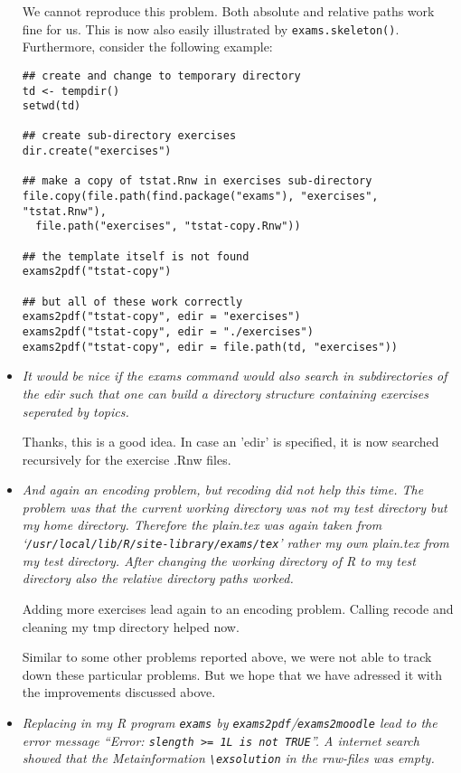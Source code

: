 \documentclass[a4paper]{article}
\begin{document}
\begin{itemize}
We cannot reproduce this problem. Both absolute and relative paths work fine
for us. This is now also easily illustrated by \texttt{exams.skeleton()}. Furthermore,
consider the following example:
\begin{verbatim}
## create and change to temporary directory
td <- tempdir()
setwd(td)

## create sub-directory exercises
dir.create("exercises")

## make a copy of tstat.Rnw in exercises sub-directory
file.copy(file.path(find.package("exams"), "exercises", "tstat.Rnw"),
  file.path("exercises", "tstat-copy.Rnw"))

## the template itself is not found
exams2pdf("tstat-copy")

## but all of these work correctly
exams2pdf("tstat-copy", edir = "exercises")
exams2pdf("tstat-copy", edir = "./exercises")
exams2pdf("tstat-copy", edir = file.path(td, "exercises"))
\end{verbatim}

\item {\it
It would be
nice if the exams command would also search in subdirectories of the edir
such that one can build a directory structure containing exercises
seperated by topics.}

Thanks, this is a good idea. In case an 'edir' is specified, it is now searched
recursively for the exercise .Rnw files.

\item {\it
And again an encoding problem, but recoding did not help this time. The
problem was that the current working directory was not my test directory
but my home directory.  Therefore the plain.tex was again taken from
`\texttt{/usr/local/lib/R/site-library/exams/tex}' rather my own plain.tex from my
test directory.  After changing the working directory of R to my test
directory also the relative directory paths worked.

Adding more exercises lead again to an encoding problem. Calling recode
and cleaning my tmp directory helped now.}

Similar to some other problems reported above, we were not able to track down
these particular problems. But we hope that we have adressed it with the
improvements discussed above.

\item {\it
Replacing in my R program \texttt{exams} by \texttt{exams2pdf}/\texttt{exams2moodle} lead to
the error message ``Error: \texttt{slength >= 1L is not TRUE}''.  A internet search
showed that the Metainformation \verb|\exsolution| in the rnw-files was empty.}


\end{itemize}
\end{document}
